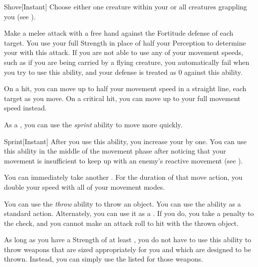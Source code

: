         \begin{instantability}{Shove}[Instant]
            \rankline
            Choose either one creature within your  or all creatures grappling you (see ).

            Make a melee attack with a free hand against the Fortitude defense of each target.
            You use your full Strength in place of half your Perception to determine your  with this attack.
            If you are not able to use any of your movement speeds, such as if you are being carried by a flying creature, you automatically fail when you try to use this ability, and your defense is treated as 0 against this ability.

            On a hit, you can move up to half your movement speed in a straight line,  each target as you move.
            On a critical hit, you can move up to your full movement speed instead.
        \end{instantability}

        \label{Sprint} As a , you can use the \textit{sprint} ability to move more quickly.

        \begin{instantability}{Sprint}[Instant]
            \rankline
            After you use this ability, you increase your  by one.
            You can use this ability in the middle of the movement phase after noticing that your movement is insufficient to keep up with an enemy's reactive movement (see ).

            You can immediately take another .
            For the duration of that move action, you double your speed with all of your movement modes.
        \end{instantability}

        \label{Throw} You can use the \textit{throw} ability to throw an object.
        You can use the ability as a standard action.
        Alternately, you can use it as a .
        If you do, you take a  penalty to the check, and you cannot make an attack roll to hit with the thrown object.

        As long as you have a Strength of at least , you do not have to use this ability to throw weapons that are sized appropriately for you and which are designed to be thrown.
        Instead, you can simply use the listed  for those weapons.


